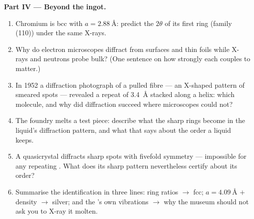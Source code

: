 \begin{problem}
\medskip\noindent\textbf{Part IV --- Beyond the ingot.}

\begin{enumerate}[resume]
  \item Chromium is bcc with $a = \qty{2.88}{\angstrom}$: predict
        the $2\theta$ of its first ring (family (110)) under the
        same X-rays.
  \item Why do electron microscopes diffract from surfaces and
        thin foils while X-rays and neutrons probe bulk? (One
        sentence on how strongly each couples to matter.)
  \item In 1952 a diffraction photograph of a pulled fibre --- an
        X-shaped pattern of smeared spots --- revealed a repeat of
        \qty{3.4}{\angstrom} stacked along a helix: which molecule,
        and why did diffraction succeed where microscopes could
        not?
  \item The foundry melts a test piece: describe what the sharp
        rings become in the liquid's diffraction pattern, and what
        that says about the order a liquid keeps.
  \item A quasicrystal diffracts sharp spots with fivefold
        symmetry --- impossible for any repeating . What
        does its sharp pattern nevertheless certify about its
        order?
  \item Summarise the identification in three lines: ring ratios
        $\to$ fcc; $a = \qty{4.09}{\angstrom}$ $+$ density $\to$
        silver; and the 's own vibrations $\to$ why the
        museum should not ask you to X-ray it molten.
\end{enumerate}
\end{problem}
